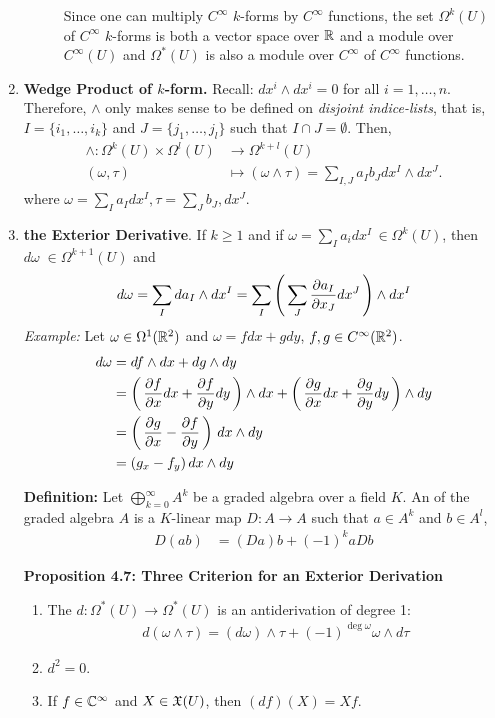 \documentclass[10pt,a4paper]{report}
\begin{document}
\begin{enumerate}
\begin{description}
		Since one can multiply $C^\infty$ $k$-forms by $C^\infty$ functions, the set $\Omega^k(U)$ of $C^\infty$ $k$-forms is both a vector space over $\mathbb{R}$ and a module over $C^\infty(U)$ and $\Omega^*(U)$ is also a module over $C^\infty$ of $C^\infty$ functions.
	\end{description}
		
	\item \textbf{Wedge Product of $k$-form.} Recall: $dx^i\wedge dx^i =0$ for all $i=1,\dots,n$.  Therefore, $\wedge$ only makes sense to be defined on \textit{disjoint indice-lists}, that is, $I=\{i_1, \dots, i_k\}$ and $J=\{j_1, \dots, j_l\}$ such that $I\cap J =\emptyset$.  Then,
		\begin{align*}
			\wedge : \Omega^k(U) \times \Omega^l(U) &\to \Omega^{k+l}(U)\\
			(\omega, \tau) &\mapsto (\omega\wedge\tau)=\sum_{I,J} a_Ib_J dx^I\wedge dx^J.
		\end{align*}where $\omega = \sum_I a_Idx^I, \tau=\sum_J b_J,dx^J$.
	\item \textbf{the Exterior Derivative}.  If $k\ge 1$ and if $\omega=\sum_Ia_idx^I\,\in \Omega^k(U)$, then $d\omega \; \in \Omega^{k+1}(U)$ and 
	\begin{align*}
		d\omega = \sum_Ida_I\wedge dx^I = \sum_I\left (\, \sum_J\frac{\partial a_I}{\partial x_J}dx^J \,\right )\wedge dx^I
	\end{align*}\textit{Example: }Let $\omega \in \Omega^1(\mathbb{R}^2)$ and $\omega = fdx+gdy$, $f,g \in C^\infty(\mathbb{R}^2)$.
	\begin{align*}
		d\omega &= df\wedge dx + dg\wedge dy \\
		&= \left (\, \frac{\partial f}{\partial x}dx+\frac{\partial f}{\partial y}dy \,\right )\wedge dx +\left (\, \frac{\partial g}{\partial x}dx+\frac{\partial g}{\partial y}dy \,\right )\wedge dy\\
		&= \left (\, \frac{\partial g}{\partial x}-\frac{\partial f}{\partial y} \,\right )\,dx\wedge dy\\
		&= (g_x-f_y)\,dx\wedge dy
	\end{align*}
	
	\textbf{Definition: } Let $\bigoplus_{k=0}^\infty A^k$ be a graded algebra over a field $K$. An  of the graded algebra $A$ is a $K$-linear map $D: A \to A$ such that $a\in A^k$ and $b\in A^l$,
	\begin{align*}
		D(ab) &= (Da)b + (-1)^kaDb
	\end{align*}
	
	\textbf{Proposition 4.7: Three Criterion for an Exterior Derivation} 
	\begin{enumerate}[label=\roman*)]
		\item The  $d: \Omega^*(U)\to\Omega^*(U)$ is an antiderivation of degree 1:
		\begin{align*}
			d(\omega\wedge\tau)=(d\omega)\wedge\tau + (-1)^{\deg\omega}\omega\wedge d\tau
	\end{align*}			
	\item $d^2=0$.
	\item If $f\in\mathbb{C}^\infty$ and $X \in \mathfrak{X}(U)$, then $(df)(X)=Xf$.
	\end{enumerate}
\end{enumerate}
\end{document}
